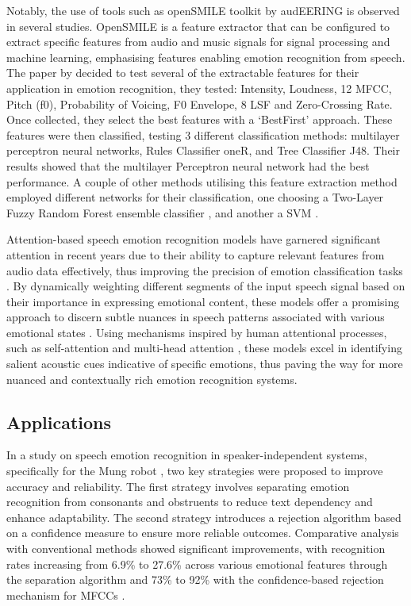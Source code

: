 Notably, the use of tools such as openSMILE toolkit by audEERING is observed in several studies. OpenSMILE is a feature extractor that can be configured to extract specific features from audio and music signals for signal processing and machine learning, emphasising features enabling emotion recognition from speech. The paper by \cite{Anjum2019-ks} decided to test several of the extractable features for their application in emotion recognition, they tested: Intensity, Loudness, 12 MFCC, Pitch (f0), Probability of Voicing, F0 Envelope, 8 LSF and Zero-Crossing Rate. Once collected, they select the best features with a `BestFirst' approach.  These features were then classified, testing 3 different classification methods: multilayer perceptron neural networks, Rules Classifier oneR, and Tree Classifier J48. Their results showed that the multilayer Perceptron neural network had the best performance. A couple of other methods utilising this feature extraction method employed different networks for their classification, one choosing a Two-Layer Fuzzy Random Forest ensemble classifier \cite{Chen2020-bt}, and another a SVM \cite{Ashok2022-xp}.

Attention-based speech emotion recognition models have garnered significant attention in recent years due to their ability to capture relevant features from audio data effectively, thus improving the precision of emotion classification tasks \cite{Peng2020-wv}. By dynamically weighting different segments of the input speech signal \cite{Zhichao2020-bf} based on their importance in expressing emotional content, these models offer a promising approach to discern subtle nuances in speech patterns associated with various emotional states \cite{Nie2022-fo}. Using mechanisms inspired by human attentional processes, such as self-attention and multi-head attention \cite{Rasendrasoa2022-nf}, these models excel in identifying salient acoustic cues indicative of specific emotions, thus paving the way for more nuanced and contextually rich emotion recognition systems.

\subsection{Applications}

In a study on speech emotion recognition in speaker-independent systems, specifically for the Mung robot \cite{Kim2009-in}, two key strategies were proposed to improve accuracy and reliability. The first strategy involves separating emotion recognition from consonants and obstruents to reduce text dependency and enhance adaptability. The second strategy introduces a rejection algorithm based on a confidence measure to ensure more reliable outcomes. Comparative analysis with conventional methods showed significant improvements, with recognition rates increasing from 6.9\% to 27.6\% across various emotional features through the separation algorithm and 73\% to 92\% with the confidence-based rejection mechanism for MFCCs \cite{Kim2018-dh}.

